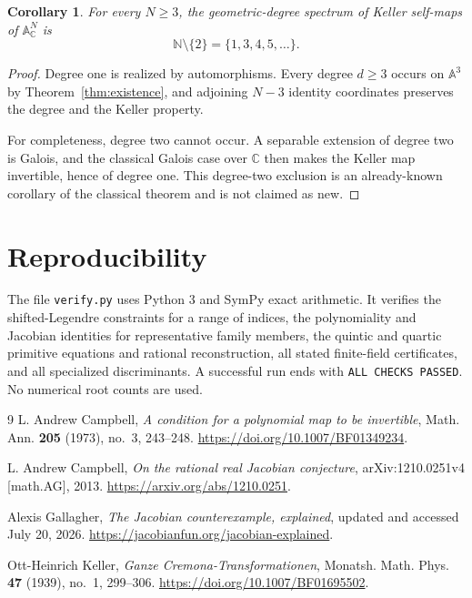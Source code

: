 \documentclass[11pt]{amsart}
\newtheorem{corollary}[theorem]{Corollary}
\theoremstyle{remark}
\newcommand{\A}{\mathbb A}
\newcommand{\C}{\mathbb C}
\newcommand{\N}{\mathbb N}
\begin{document}
\begin{corollary}\label{cor:spectrum}
For every $N\ge3$, the geometric-degree spectrum of Keller self-maps of $\A^N_\C$ is
\[
 \N\setminus\{2\}=\{1,3,4,5,\ldots\}.
\]
\end{corollary}
\begin{proof}
Degree one is realized by automorphisms.  Every degree $d\ge3$ occurs on $\A^3$ by Theorem~\ref{thm:existence}, and adjoining $N-3$ identity coordinates preserves the degree and the Keller property.

For completeness, degree two cannot occur.  A separable extension of degree two is Galois, and the classical Galois case over $\C$ \cite{Campbell73,Campbell13} then makes the Keller map invertible, hence of degree one.  This degree-two exclusion is an already-known corollary of the classical theorem and is not claimed as new.
\end{proof}

\section{Reproducibility}
The file \texttt{verify.py} uses Python 3 and SymPy exact arithmetic.  It verifies the shifted-Legendre constraints for a range of indices, the polynomiality and Jacobian identities for representative family members, the quintic and quartic primitive equations and rational reconstruction, all stated finite-field certificates, and all specialized discriminants.  A successful run ends with \texttt{ALL CHECKS PASSED}.  No numerical root counts are used.

\begin{thebibliography}{9}
L. Andrew Campbell,
\emph{A condition for a polynomial map to be invertible},
Math. Ann. \textbf{205} (1973), no.~3, 243--248.
\url{https://doi.org/10.1007/BF01349234}.

L. Andrew Campbell,
\emph{On the rational real Jacobian conjecture},
arXiv:1210.0251v4 [math.AG], 2013.
\url{https://arxiv.org/abs/1210.0251}.

Alexis Gallagher,
\emph{The Jacobian counterexample, explained},
updated and accessed July 20, 2026.
\url{https://jacobianfun.org/jacobian-explained}.

Ott-Heinrich Keller,
\emph{Ganze Cremona-Transformationen},
Monatsh. Math. Phys. \textbf{47} (1939), no.~1, 299--306.
\url{https://doi.org/10.1007/BF01695502}.
\end{thebibliography}
\end{document}
